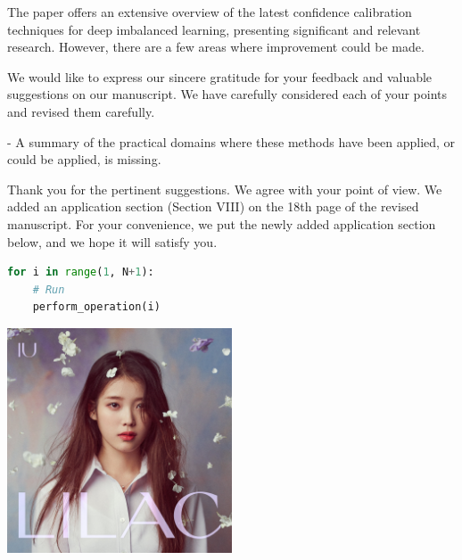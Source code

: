 
\reviewer

\begin{generalcomment}
The paper offers an extensive overview of the latest confidence calibration techniques for deep imbalanced learning, presenting significant and relevant research. However, there are a few areas where improvement could be made.
\end{generalcomment}
\begin{revmeta}[]
We would like to express our sincere gratitude for your feedback and valuable suggestions on our manuscript. We have carefully considered each of your points and revised them carefully.
\end{revmeta}

\begin{revcomment}
- A summary of the practical domains where these methods have been applied, or could be applied, is missing.
\end{revcomment}
\begin{revresponse}[]
Thank you for the pertinent suggestions. We agree with your point of view. We added an application section (Section VIII) on the 18th page of the revised manuscript. For your convenience, we put the newly added application section below, and we hope it will satisfy you.
	
\begin{changes}
\lipsum[1]

\begin{lstlisting}[language=Python, caption={Algorithm},frame=single]
	for i in range(1, N+1):
	# Run
	perform_operation(i)
\end{lstlisting}

\lipsum[2]

\centering
\includegraphics[width=0.5\textwidth,keepaspectratio]{imgs/IU1.jpg}
\end{changes}
	
\end{revresponse}

\clearpage
\printbibliography[heading=bibintoc, heading=bibliography, title={References}, section=\therefsection]